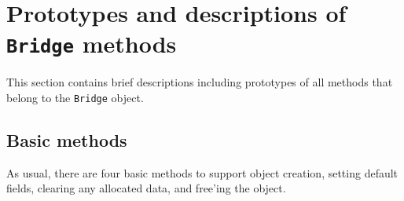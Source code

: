\section{Prototypes and descriptions of \texttt{Bridge} methods}
\label{section:Bridge:proto}
\par
This section contains brief descriptions including prototypes
of all methods that belong to the {\tt Bridge} object.
\par
\subsection{Basic methods}
\label{subsection:Bridge:proto:basics}
\par
As usual, there are four basic methods to support object creation,
setting default fields, clearing any allocated data, and free'ing
the object.
\par
